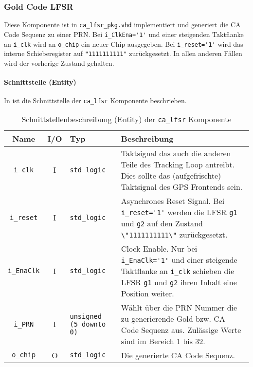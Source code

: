\subsubsection{Gold Code LFSR}
Diese Komponente ist in  \lstinline$ca_lfsr_pkg.vhd$ implementiert und generiert die \gls{CA} Code Sequenz zu einer PRN. Bei \lstinline$i_ClkEna='1'$ und einer steigenden Taktflanke an \lstinline$i_clk$ wird an \lstinline$o_chip$ ein neuer Chip ausgegeben. Bei \lstinline$i_reset='1'$ wird das interne Schieberegister auf \lstinline$"1111111111"$ zurückgesetzt. In allen anderen Fällen wird der vorherige Zustand gehalten.


\paragraph{Schnittstelle (Entity)}
In  ist die Schnittstelle der \lstinline$ca_lfsr$ Komponente beschrieben.

\begin{table}[htbp]
    \ttabbox
    {
        \caption[LFSR Schnittstelle]{Schnittstellenbeschreibung (Entity) der \lstinline$ca_lfsr$ Komponente}
        \label{TabCALFSR_Entity}
    }
    {
    \begin{tabular}{c c  p{2cm} p{6cm}}
        \toprule
        Name                    & I/O  & Typ                               & Beschreibung \\
        \midrule
        \lstinline$i_clk$       & I         & \lstinline$std_logic$             & Taktsignal das auch die anderen Teile des Tracking Loop antreibt. Dies sollte das (aufgefrischte) Taktsignal des GPS Frontends sein.\\
        \lstinline$i_reset$     & I         & \lstinline$std_logic$             & Asynchrones Reset Signal. Bei \lstinline$i_reset='1'$ werden die LFSR \lstinline$g1$ und \lstinline$g2$ auf den Zustand \lstinline$\"1111111111\"$ zurückgesetzt.\\
        \lstinline$i_EnaClk$    & I         & \lstinline$std_logic$             & Clock Enable. Nur bei \lstinline$i_EnaClk='1'$ und einer steigende Taktflanke an \lstinline$i_clk$ schieben die LFSR \lstinline$g1$ und \lstinline$g2$ ihren Inhalt eine Position weiter.\\
        \lstinline$i_PRN$       & I         & \lstinline$unsigned (5 downto 0)$ & Wählt über die PRN Nummer die zu generierende Gold bzw. \gls{CA} Code Sequenz aus. Zulässige Werte sind im Bereich 1 bis 32.\\
        \lstinline$o_chip$      & O         & \lstinline$std_logic$             & Die generierte \gls{CA} Code Sequenz.\\
        \bottomrule
    \end{tabular}
}
\end{table}


